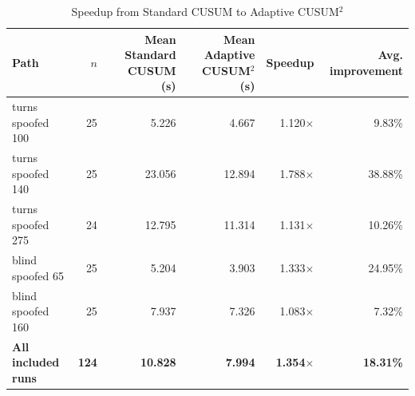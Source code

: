 \begin{table}[ht]
\centering
\caption{Speedup from Standard CUSUM to Adaptive CUSUM$^2$}
\label{tab:standard_cusum_adaptive_cusum2_speedup}
\begin{tabular}{lrrrrr}
\toprule
Path & $n$ & Mean Standard CUSUM (s) & Mean Adaptive CUSUM$^2$ (s) & Speedup & Avg. improvement \\
\midrule
turns spoofed 100 & 25 & 5.226 & 4.667 & 1.120$\times$ & 9.83\% \\
turns spoofed 140 & 25 & 23.056 & 12.894 & 1.788$\times$ & 38.88\% \\
turns spoofed 275 & 24 & 12.795 & 11.314 & 1.131$\times$ & 10.26\% \\
blind spoofed 65 & 25 & 5.204 & 3.903 & 1.333$\times$ & 24.95\% \\
blind spoofed 160 & 25 & 7.937 & 7.326 & 1.083$\times$ & 7.32\% \\
\midrule
\textbf{All included runs} & \textbf{124} & \textbf{10.828} & \textbf{7.994} & \textbf{1.354$\times$} & \textbf{18.31\%} \\
\bottomrule
\end{tabular}
\end{table}
